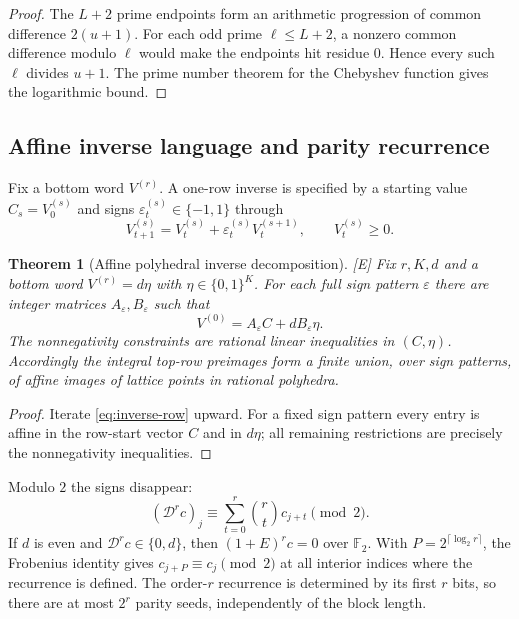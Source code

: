 \documentclass[11pt]{article}
\newtheorem{theorem}{Theorem}[section]
\theoremstyle{definition}
\theoremstyle{remark}
\newcommand{\Ftwo}{\mathbb F_{2}}
\newcommand{\eps}{\varepsilon}
\newcommand{\Dabs}{\mathcal D}
\newcommand{\status}[1]{\textnormal{\textcolor{accent}{\footnotesize[#1]}}}
\begin{document}
\begin{proof}
The $L+2$ prime endpoints form an arithmetic progression of common difference
$2(u+1)$.  For each odd prime $\ell\le L+2$, a nonzero common difference modulo
$\ell$ would make the endpoints hit residue $0$.  Hence every such $\ell$ divides
$u+1$.  The prime number theorem for the Chebyshev function gives the logarithmic bound.
\end{proof}

\subsection{Affine inverse language and parity recurrence}

Fix a bottom word $V^{(r)}$.  A one-row inverse is specified by a starting value
$C_s=V^{(s)}_0$ and signs $\eps_t^{(s)}\in\{-1,1\}$ through
\begin{equation}\label{eq:inverse-row}
 V^{(s)}_{t+1}=V^{(s)}_t+\eps_t^{(s)}V^{(s+1)}_t,
 \qquad V^{(s)}_t\ge0.
\end{equation}

\begin{theorem}[Affine polyhedral inverse decomposition]
\label{thm:affine-inverse}
\status{E}
Fix $r,K,d$ and a bottom word $V^{(r)}=d\eta$ with
$\eta\in\{0,1\}^K$.  For each full sign pattern $\eps$ there are integer matrices
$A_\eps,B_\eps$ such that
\begin{equation}\label{eq:affine-inverse}
 V^{(0)}=A_\eps C+dB_\eps\eta.
\end{equation}
The nonnegativity constraints are rational linear inequalities in $(C,\eta)$.
Accordingly the integral top-row preimages form a finite union, over sign patterns, of
affine images of lattice points in rational polyhedra.
\end{theorem}

\begin{proof}
Iterate \eqref{eq:inverse-row} upward.  For a fixed sign pattern every entry is affine in
the row-start vector $C$ and in $d\eta$; all remaining restrictions are precisely the
nonnegativity inequalities.
\end{proof}

Modulo $2$ the signs disappear:
\begin{equation}\label{eq:parity-D-r}
 (\Dabs^rc)_j\equiv\sum_{t=0}^{r}\binom rt c_{j+t}\pmod2.
\end{equation}
If $d$ is even and $\Dabs^rc\in\{0,d\}$, then $(1+E)^rc=0$ over $\Ftwo$.  With
$P=2^{\lceil\log_2r\rceil}$, the Frobenius identity gives
$c_{j+P}\equiv c_j\pmod2$ at all interior indices where the recurrence is defined.
The order-$r$ recurrence is determined by its first $r$ bits, so there are at most
$2^r$ parity seeds, independently of the block length.
\end{document}
